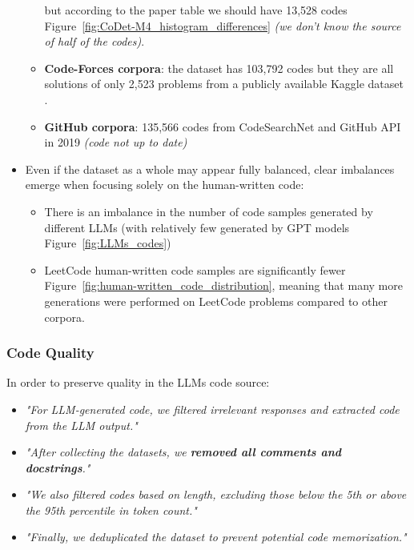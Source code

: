 \begin{itemize}
\begin{itemize}
            but according to the paper table we should have 13,528 codes Figure~\ref{fig:CoDet-M4_histogram_differences} 
            \textit{(we don't know the source of half of the codes)}.
            \item \textbf{Code-Forces corpora}: the dataset has 103,792 codes but they are all
            solutions of only 2,523 problems from 
            a publicly available Kaggle dataset \cite{CodeforcesKaggle}.
            \item \textbf{GitHub corpora}: 135,566 codes from 
            CodeSearchNet \cite{husain2019codesearchnet} 
            and GitHub API in 2019 \textit{(code not up to date)}
        \end{itemize}
    \item Even if the dataset as a whole may appear fully balanced, 
    clear imbalances emerge when focusing solely on the human-written code:
            \begin{itemize}
            \item There is an imbalance in the number of code samples generated by 
            different LLMs (with relatively few generated by GPT models 
            Figure~\ref{fig:LLMs_codes})
            \item LeetCode human-written code samples are significantly 
            fewer Figure~\ref{fig:human-written_code_distribution}, meaning that many more generations were performed on 
            LeetCode problems compared to other corpora.
    \end{itemize}
\end{itemize}






\subsubsection*{Code Quality}
In order to preserve quality in the LLMs code source:
\begin{itemize}
    \item \textit{"For LLM-generated code, we filtered irrelevant responses and extracted code from the LLM output."}
    \item \textit{"After collecting the datasets, we \textbf{removed all comments and docstrings}."}
    \item \textit{"We also filtered codes based on length, excluding those below the 5th or above the 95th percentile in token count."}
    \item \textit{"Finally, we deduplicated the dataset to prevent potential code memorization."}
\end{itemize}


